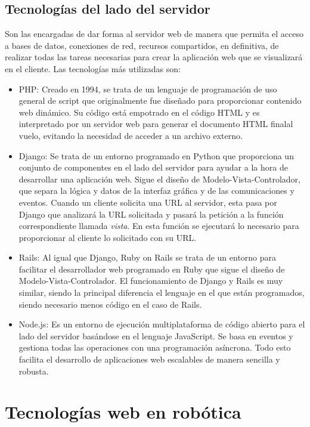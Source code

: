 \subsection{Tecnologías del lado del servidor}
Son las encargadas de dar forma al servidor web de manera que permita el acceso a bases de datos, conexiones de red, recursos compartidos, en definitiva, de realizar todas las tareas necesarias para crear la aplicación web que se visualizará en el cliente. Las tecnologías más utilizadas son:
\begin{itemize}
	\item PHP: Creado en 1994, se trata de un lenguaje de programación de uso general de script que originalmente fue diseñado para proporcionar contenido web dinámico. Su código está empotrado en el código HTML y es interpretado por un servidor web para generar el documento HTML finalal vuelo, evitando la necesidad de acceder a un archivo externo.
	\item Django: Se trata de un entorno programado en Python que proporciona un conjunto de componentes en el lado del servidor para ayudar a la hora de desarrollar una aplicación web. Sigue el diseño de Modelo-Vista-Controlador, que separa la lógica y datos de la interfaz gráfica y de las comunicaciones y eventos. Cuando un cliente solicita una URL al servidor, esta pasa por Django que analizará la URL solicitada y pasará la petición a la función correspondiente llamada \textit{vista}. En esta función se ejecutará lo necesario para proporcionar al cliente lo solicitado con su URL.
	\item Rails: Al igual que Django, Ruby on Rails se trata de un entorno para facilitar el desarrollador web programado en Ruby que sigue el diseño de Modelo-Vista-Controlador. El funcionamiento de Django y Rails es muy similar, siendo la principal diferencia el lenguaje en el que están programados, siendo necesario menos código en el caso de Rails.
	\item Node.js: Es un entorno de ejecución multiplataforma de código abierto para el lado del servidor basándose en el lenguaje JavaScript. Se basa en eventos y gestiona todas las operaciones con una programación asíncrona. Todo esto facilita el desarrollo de aplicaciones web escalables de manera sencilla y robusta.
\end{itemize}

\section{Tecnologías web en robótica}

